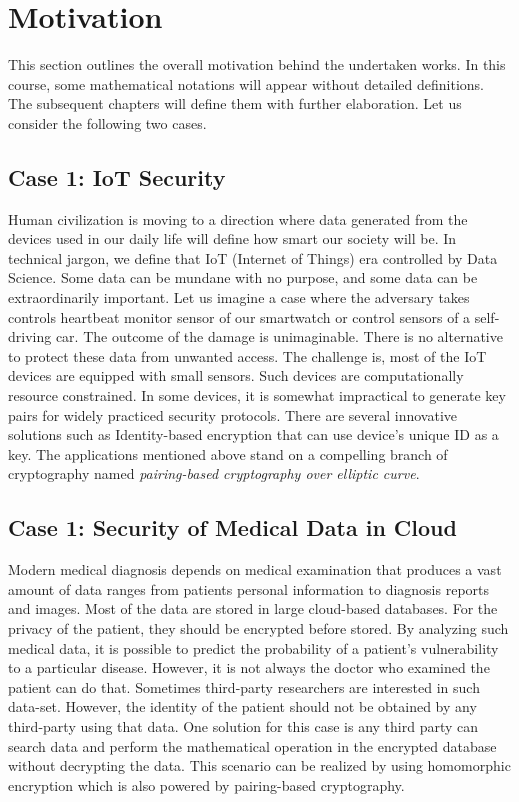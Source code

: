 \section{Motivation}
\label{ch1_sec_motivation}

This section outlines the overall motivation behind the undertaken works.
In this course, some mathematical notations will appear without detailed definitions.
The subsequent chapters will define them with further elaboration.
Let us consider the following two cases.

\subsection*{Case 1: IoT Security}
Human civilization is moving to a direction where data generated from the devices used in our daily life will define how smart our society will be.
In technical jargon, we define that IoT (Internet of Things) era controlled by Data Science.
Some data can be mundane with no purpose, and some data can be extraordinarily important.
Let us imagine a case where the adversary takes controls heartbeat monitor sensor of our smartwatch or control sensors of a self-driving car.
The outcome of the damage is unimaginable. 
There is no alternative to protect these data from unwanted access.
The challenge is, most of the IoT devices are equipped with small sensors.
Such devices are computationally resource constrained.
In some devices, it is somewhat impractical to generate key pairs for widely practiced security protocols.
There are several innovative solutions such as Identity-based encryption that can use device's unique ID as a key.
The applications mentioned above stand on a compelling branch of cryptography named \textit{pairing-based cryptography over elliptic curve}.


\subsection*{Case 1: Security of Medical Data in Cloud}
Modern medical diagnosis depends on medical examination that produces a vast amount of data ranges from patients personal information to diagnosis reports and images.
Most of the data are stored in large cloud-based databases. 
For the privacy of the patient, they should be encrypted before stored.
By analyzing such medical data, it is possible to predict the probability of a patient's vulnerability to a particular disease. 
However, it is not always the doctor who examined the patient can do that.
Sometimes third-party researchers are interested in such data-set. 
However, the identity of the patient should not be obtained by any third-party using that data. 
One solution for this case is any third party can search data and perform the mathematical operation in the encrypted database without decrypting the data.
This scenario can be realized by using homomorphic encryption which is also powered by pairing-based cryptography.

